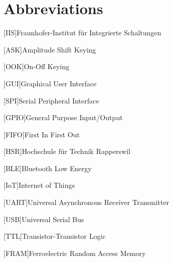 \chapter*{Abbreviations}

\begin{acronym}
	[IIS]{Fraunhofer-Institut für Integrierte Schaltungen}
\end{acronym}

\begin{acronym}
	[ASK]{Amplitude Shift Keying}
\end{acronym}

\begin{acronym}
	[OOK]{On-Off Keying}
\end{acronym}

\begin{acronym}
	[GUI]{Graphical User Interface}
\end{acronym}

\begin{acronym}
	[SPI]{Serial Peripheral Interface}
\end{acronym}

\begin{acronym}
	[GPIO]{General Purpose Input/Output}
\end{acronym}

\begin{acronym}
	[FIFO]{First In First Out}
\end{acronym}

\begin{acronym}
	[HSR]{Hochschule für Technik Rapperswil}
\end{acronym}

\begin{acronym}
	[BLE]{Bluetooth Low Energy}
\end{acronym}

\begin{acronym}
	[IoT]{Internet of Things}
\end{acronym}

\begin{acronym}
	[UART]{Universal Asynchronous Receiver Transmitter}
\end{acronym}

\begin{acronym}
	[USB]{Universal Serial Bus}
\end{acronym}

\begin{acronym}
	[TTL]{Transistor-Transistor Logic}
\end{acronym}

\begin{acronym}
	[FRAM]{Ferroelectric Random Access Memory}
\end{acronym}